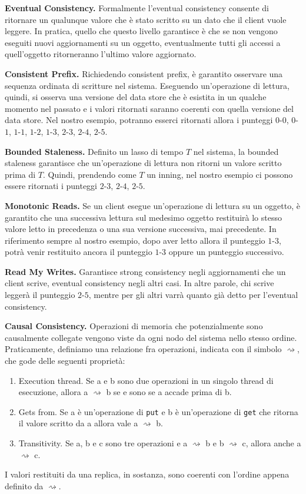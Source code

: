 \documentclass[twoside]{article}
\begin{document}
\begin{multicols}{2}
\textbf{Eventual Consistency.} Formalmente l'eventual consistency consente di ritornare un qualunque valore che è stato scritto su un dato che il client vuole leggere. In pratica, quello che questo livello garantisce è che se non vengono eseguiti nuovi aggiornamenti su un oggetto, eventualmente tutti gli accessi a quell'oggetto ritorneranno l'ultimo valore aggiornato.

\textbf{Consistent Prefix.} Richiedendo consistent prefix, è garantito osservare una sequenza ordinata di scritture nel sistema. Eseguendo un'operazione di lettura, quindi, si osserva una versione del data store che è esistita in un qualche momento nel passato e i valori ritornati saranno coerenti con quella versione del data store. Nel nostro esempio, potranno esserci ritornati allora i punteggi $0$-$0$, $0$-$1$, $1$-$1$, $1$-$2$, $1$-$3$, $2$-$3$, $2$-$4$, $2$-$5$.

\textbf{Bounded Staleness.} Definito un lasso di tempo $T$ nel sistema, la bounded staleness garantisce che un'operazione di lettura non ritorni un valore scritto prima di $T$. Quindi, prendendo come $T$ un inning, nel nostro esempio ci possono essere ritornati i punteggi $2$-$3$, $2$-$4$, $2$-$5$.

\textbf{Monotonic Reads.} Se un client esegue un'operazione di lettura su un oggetto, è garantito che una successiva lettura sul medesimo oggetto restituirà lo stesso valore letto in precedenza o una sua versione successiva, mai precedente. In riferimento sempre al nostro esempio, dopo aver letto allora il punteggio $1$-$3$, potrà venir restituito ancora il punteggio $1$-$3$ oppure un punteggio successivo.

\textbf{Read My Writes.}	Garantisce strong consistency negli aggiornamenti che un client scrive, eventual consistency negli altri casi. In altre parole, chi scrive leggerà il punteggio $2$-$5$, mentre per gli altri varrà quanto già detto per l'eventual consistency.

\textbf{Causal Consistency.} Operazioni di memoria che potenzialmente sono causalmente collegate vengono viste da ogni nodo del sistema nello stesso ordine. Praticamente, definiamo una relazione fra operazioni, indicata con il simbolo $\rightsquigarrow$, che gode delle seguenti proprietà:
\begin{enumerate}[topsep=0pt,itemsep=-1ex,partopsep=1ex,parsep=1ex]
\item Execution thread. Se a e b sono due operazioni in un singolo thread di esecuzione, allora a $\rightsquigarrow$ b se e sono se a accade prima di b.
\item Gets from. Se a è un'operazione di \texttt{put} e b è un'operazione di \texttt{get} che ritorna il valore scritto da a allora vale a $\rightsquigarrow$ b.
\item Transitivity. Se a, b e c sono tre operazioni e a $\rightsquigarrow$ b e b $\rightsquigarrow$ c, allora anche a $\rightsquigarrow$ c.
\end{enumerate}
I valori restituiti da una replica, in sostanza, sono coerenti con l'ordine appena definito da $\rightsquigarrow$.


\end{multicols}
\end{document}
